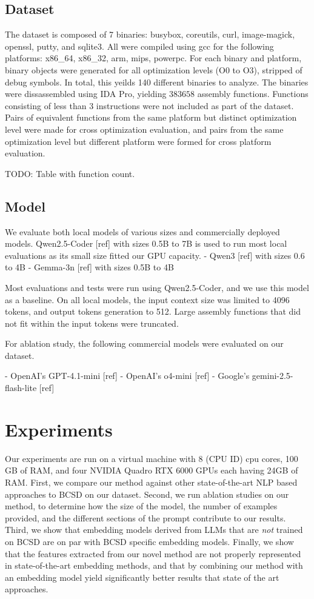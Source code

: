\documentclass[conference,compsoc]{IEEEtran}
\begin{document}
\subsection{Dataset}

The dataset is composed of 7 binaries: busybox, coreutils, curl, image-magick, openssl, putty, and sqlite3.
All were compiled using gcc for the following platforms: x86\_64, x86\_32, arm, mips, powerpc.
For each binary and platform, binary objects were generated for all optimization levels (O0 to O3),
stripped of debug symbols. In total, this yeilds 140 different binaries to analyze.
The binaries were dissassembled using IDA Pro, yielding \(383 658\) assembly functions.
Functions consisting of less than 3 instructions were not included as part of the dataset.
Pairs of equivalent functions from the same platform but distinct optimization level were made for cross optimization
evaluation, and pairs from the same optimization level but different platform were formed for cross
platform evaluation.

TODO: Table with function count.

\subsection{Model}

We evaluate both local models of various sizes and commercially deployed models. Qwen2.5-Coder [ref] with sizes 0.5B to 7B
is used to run most local evaluations as its small size fitted our GPU capacity.
- Qwen3 [ref] with sizes 0.6 to 4B
- Gemma-3n [ref] with sizes 0.5B to 4B

Most evaluations and tests were run using Qwen2.5-Coder, and we use this model as a baseline.
On all local models, the input context size was limited to 4096 tokens, and output tokens generation to 512.
Large assembly functions that did not fit within the input tokens were truncated.

For ablation study, the following commercial models were evaluated on our dataset.

- OpenAI's GPT-4.1-mini [ref]
- OpenAI's o4-mini [ref]
- Google's gemini-2.5-flash-lite [ref]

\section{Experiments}

Our experiments are run on a virtual machine with 8 (CPU ID) cpu cores, 100 GB of RAM, and four NVIDIA Quadro RTX
6000 GPUs each having  24GB of RAM. First, we compare our method against other state-of-the-art NLP based
approaches to BCSD on our dataset. Second, we run ablation studies on our method, to determine how the size
of the model, the number of examples provided, and the different sections of the prompt contribute to our results.
Third, we show that embedding models derived from LLMs that are \textit{not} trained on BCSD are on par with BCSD specific
embedding models. Finally, we show that the features extracted from our novel method are not properly represented
in state-of-the-art embedding methods, and that by combining our method with an embedding model yield significantly
better results that state of the art approaches.
\end{document}
